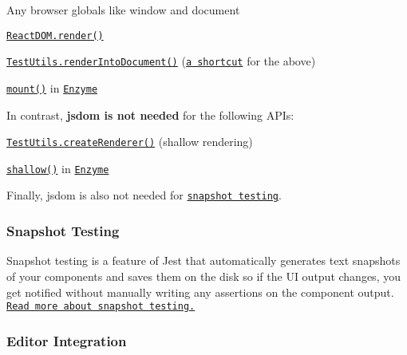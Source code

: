\begin{DoxyItemize}
\item Any browser globals like {\ttfamily window} and {\ttfamily document}
\item \href{https://facebook.github.io/react/docs/top-level-api.html#reactdom.render}{\tt {\ttfamily React\+D\+O\+M.\+render()}}
\item \href{https://facebook.github.io/react/docs/test-utils.html#renderintodocument}{\tt {\ttfamily Test\+Utils.\+render\+Into\+Document()}} (\href{https://github.com/facebook/react/blob/34761cf9a252964abfaab6faf74d473ad95d1f21/src/test/ReactTestUtils.js#L83-L91}{\tt a shortcut} for the above)
\item \href{http://airbnb.io/enzyme/docs/api/mount.html}{\tt {\ttfamily mount()}} in \href{http://airbnb.io/enzyme/index.html}{\tt Enzyme}
\end{DoxyItemize}

In contrast, {\bfseries jsdom is not needed} for the following A\+P\+Is\+:


\begin{DoxyItemize}
\item \href{https://facebook.github.io/react/docs/test-utils.html#shallow-rendering}{\tt {\ttfamily Test\+Utils.\+create\+Renderer()}} (shallow rendering)
\item \href{http://airbnb.io/enzyme/docs/api/shallow.html}{\tt {\ttfamily shallow()}} in \href{http://airbnb.io/enzyme/index.html}{\tt Enzyme}
\end{DoxyItemize}

Finally, jsdom is also not needed for \href{http://facebook.github.io/jest/blog/2016/07/27/jest-14.html}{\tt snapshot testing}.

\subsubsection*{Snapshot Testing}

Snapshot testing is a feature of Jest that automatically generates text snapshots of your components and saves them on the disk so if the UI output changes, you get notified without manually writing any assertions on the component output. \href{http://facebook.github.io/jest/blog/2016/07/27/jest-14.html}{\tt Read more about snapshot testing.}

\subsubsection*{Editor Integration}

